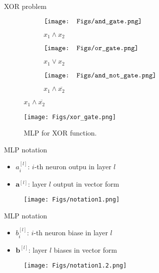 \documentclass[compress,oilve,t]{beamer}
\begin{document}
\begin{frame}{XOR problem}
	\begin{figure}
		\centering
		\begin{subfigure}[b]{0.25\textwidth}
			\centering
			$\vcenter{\hbox{\texttt{[image: Figs/and\_gate.png]}}}$
			\caption{$x_1 \wedge x_2$}
		\end{subfigure}
		\hspace*{0.5em}
		\begin{subfigure}[b]{0.25\textwidth}
			\centering
			$\vcenter{\hbox{\texttt{[image: Figs/or\_gate.png]}}}$
			\caption{$x_1 \vee x_2$}
		\end{subfigure}
		\hspace*{0.5em}
		\begin{subfigure}[b]{0.25\textwidth}
			\centering
			$\vcenter{\hbox{\texttt{[image: Figs/and\_not\_gate.png]}}}$
			\caption{$x_1 \wedge \overline{x_2}$}
		\end{subfigure}
	\end{figure}
	\pause
	\begin{figure}[H]
		\centering
		\texttt{[image: Figs/xor\_gate.png]}
		\caption{MLP for XOR function.}
	\end{figure}
\end{frame}




\begin{frame}{MLP notation}
	\begin{itemize}
		\item $a^{[l]}_i$: $i$-th neuron outpu in layer $l$
		\item $\bm{a}^{[l]}$: layer $l$ output in vector form
	\end{itemize}
	\begin{figure}[H]
		\centering
		\texttt{[image: Figs/notation1.png]}
	\end{figure}
\end{frame}

\begin{frame}{MLP notation}
	\begin{itemize}
		\item $b^{[l]}_i$: $i$-th neuron biase in layer $l$
		\item $\bm{b}^{[l]}$: layer $l$ biases in vector form
	\end{itemize}
	\begin{figure}[H]
		\centering
		\texttt{[image: Figs/notation1.2.png]}
	\end{figure}
\end{frame}
\end{document}

